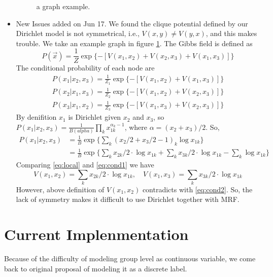 \documentclass{article}
\begin{document}
\begin{itemize}
\begin{figure}[htb]
  \caption{a graph example.}
  \label{fig:graph1}
\end{figure}


  \item New Issues added on Jun 17. We found the clique potential defined by our Dirichlet model is not symmetrical, i.e., $V(x, y) \neq V(y, x)$, and this makes trouble. We take an example graph in figure \ref{fig:graph1}. The Gibbs field is defined as
\begin{equation*}
  P(\vec x) = \frac{1}{Z} \exp \{- [V(x_1, x_2) + V(x_2, x_3) + V(x_1, x_3)]\}
\end{equation*}
The conditional probability of each node are
\begin{align}
  P(x_1 | x_2, x_3) = \frac{1}{Z_1} \exp \{ - [V(x_1, x_2) + V(x_1, x_3)] \}\label{eq:cond1}\\
  P(x_2 | x_1, x_3) = \frac{1}{Z_2} \exp \{ - [V(x_1, x_2) + V(x_2, x_3)] \}\label{eq:cond2}\\
  P(x_3 | x_1, x_2) = \frac{1}{Z_3} \exp \{ - [V(x_1, x_3) + V(x_2, x_3)] \label{eq:cond3}\}
\end{align}
By denifition $x_1$ is Dirichlet given $x_2$ and $x_3$, so $P(x_1|x_2, x_3) = \frac{1}{B(alpha)} \prod_k x_{1k}^{\alpha_k - 1}$, where $\alpha = (x_2 + x_3)/2$. So,
\begin{align}
  P(x_1 | x_2, x_3) &= \frac{1}{B} \exp \{ \sum_k (x_2/2 + x_3/2 - 1)_k \log x_{1k}\}\\
  &= \frac{1}{B} \exp \{ \sum_k x_{2k}/2 \cdot \log x_{1k} + \sum_k x_{3k}/2 \cdot  \log x_{1k} - \sum_k \log x_{1k}\} \label{eq:local}
\end{align}
Comparing \eqref{eq:local} and \eqref{eq:cond1} we have
\begin{equation*}
  V(x_1, x_2) = \sum_k x_{2k}/2 \cdot \log x_{1k}, \quad   V(x_1, x_3) = \sum_k x_{3k}/2 \cdot \log x_{1k}
\end{equation*}
However, above definition of $V(x_1, x_2)$ contradicts with \eqref{eq:cond2}. So, the lack of symmetry makes it difficult to use Dirichlet together with MRF.
\end{itemize}

\section{Current Implenmentation}
Because  of the difficulty of modeling group level as continuous variable, we come back to original proposal of modeling it as a discrete label.
\end{document}

